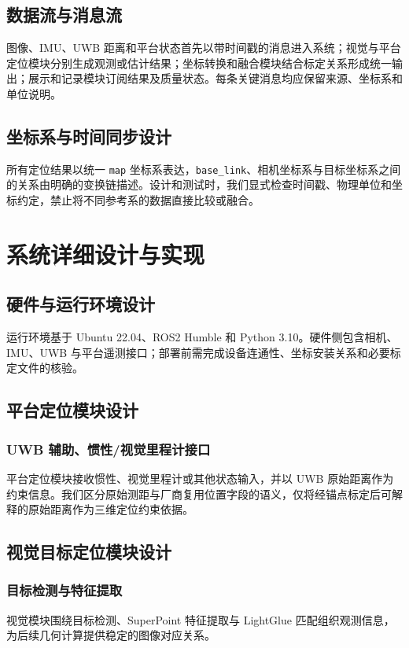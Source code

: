 \documentclass[UTF8,a4paper,12pt]{ctexart}
\begin{document}
\subsection{数据流与消息流}
图像、IMU、UWB 距离和平台状态首先以带时间戳的消息进入系统；视觉与平台定位模块分别生成观测或估计结果；坐标转换和融合模块结合标定关系形成统一输出；展示和记录模块订阅结果及质量状态。每条关键消息均应保留来源、坐标系和单位说明。

\subsection{坐标系与时间同步设计}
所有定位结果以统一 \texttt{map} 坐标系表达，\texttt{base\_link}、相机坐标系与目标坐标系之间的关系由明确的变换链描述。设计和测试时，我们显式检查时间戳、物理单位和坐标约定，禁止将不同参考系的数据直接比较或融合。

\section{系统详细设计与实现}\label{sec:design}
\subsection{硬件与运行环境设计}
运行环境基于 Ubuntu 22.04、ROS2 Humble 和 Python 3.10。硬件侧包含相机、IMU、UWB 与平台遥测接口；部署前需完成设备连通性、坐标安装关系和必要标定文件的核验。

\subsection{平台定位模块设计}
\subsubsection{UWB 辅助、惯性/视觉里程计接口}
平台定位模块接收惯性、视觉里程计或其他状态输入，并以 UWB 原始距离作为约束信息。我们区分原始测距与厂商复用位置字段的语义，仅将经锚点标定后可解释的原始距离作为三维定位约束依据。

\subsection{视觉目标定位模块设计}
\subsubsection{目标检测与特征提取}
视觉模块围绕目标检测、SuperPoint 特征提取与 LightGlue 匹配组织观测信息，为后续几何计算提供稳定的图像对应关系。
\end{document}
